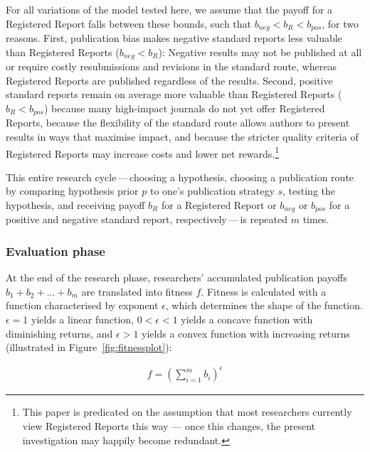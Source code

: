 \documentclass[
  british,
  a4paper,
  ,man,mask,floatsintext]{apa6}
\begin{document}
For all variations of the model tested here, we assume that the payoff for a Registered Report falls between these bounds, such that \(b_{neg} < b_{R} < b_{pos}\), for two reasons.
First, publication bias makes negative standard reports less valuable than Registered Reports (\(b_{neg} < b_{R}\)): Negative results may not be published at all or require costly resubmissions and revisions in the standard route, whereas Registered Reports are published regardless of the results.
Second, positive standard reports remain on average more valuable than Registered Reports (\(b_{R} < b_{pos}\)) because many high-impact journals do not yet offer Registered Reports, because the flexibility of the standard route allows authors to present results in ways that maximise impact, and because the stricter quality criteria of Registered Reports may increase costs and lower net rewards.\footnote{This paper is predicated on the assumption that most researchers currently view Registered Reports this way --- once this changes, the present investigation may happily become redundant.}

This entire research cycle\(\,\)---\(\,\)choosing a hypothesis, choosing a publication route by comparing hypothesis prior \(p\) to one's publication strategy \(s\), testing the hypothesis, and receiving payoff \(b_{R}\) for a Registered Report or \(b_{neg}\) or \(b_{pos}\) for a positive and negative standard report, respectively\(\,\)---\(\,\)is repeated \(m\) times.

\subsubsection{Evaluation phase}\label{evaluation-phase}

At the end of the research phase, researchers' accumulated publication payoffs \(b_1 + b_2 + ... + b_m\) are translated into fitness \(f\).
Fitness is calculated with a function characterised by exponent \(\epsilon\), which determines the shape of the function. \(\epsilon = 1\) yields a linear function, \(0 < \epsilon < 1\) yields a concave function with diminishing returns, and \(\epsilon > 1\) yields a convex function with increasing returns (illustrated in Figure~\ref{fig:fitnessplot}):

\begin{align}
f = (\sum_{i=1}^{m} b_i)^\epsilon
\end{align}
\end{document}
